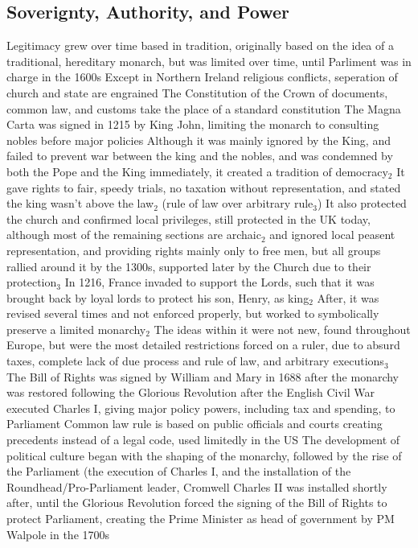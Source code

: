\documentclass[11 pt, twoside]{article}
\newcommand{\foot}[1]{\hyperlink{#1}{$_#1$}}
\newenvironment{outline*}
{
	\begin{outline}[enumerate]
	}
	{\end{outline}
}
\begin{document}
\subsection{Soverignty, Authority, and Power}
\begin{outline*}
\1 Legitimacy grew over time based in tradition, originally based on the idea of a traditional, hereditary monarch, but was limited over time, until Parliment was in charge in the 1600s
\2 Except in Northern Ireland religious conflicts, seperation of church and state are engrained
\2 The Constitution of the Crown of documents, common law, and customs take the place of a standard constitution
\3 The Magna Carta was signed in 1215 by King John, limiting the monarch to consulting nobles before major policies
\4 Although it was mainly ignored by the King, and failed to prevent war between the king and the nobles, and was condemned by both the Pope and the King immediately, it created a tradition of democracy\foot{2}
\4 It gave rights to fair, speedy trials, no taxation without representation, and stated the king wasn't above the law\foot{2} (rule of law over arbitrary rule\foot{3})
\4 It also protected the church and confirmed local privileges, still protected in the UK today, although most of the remaining sections are archaic\foot{2} and ignored local peasent representation, and providing rights mainly only to free men, but all groups rallied around it by the 1300s, supported later by the Church due to their protection\foot{3}
\4 In 1216, France invaded to support the Lords, such that it was brought back by loyal lords to protect his son, Henry, as king\foot{2}
\4 After, it was revised several times and not enforced properly, but worked to symbolically preserve a limited monarchy\foot{2}
\4 The ideas within it were not new, found throughout Europe, but were the most detailed restrictions forced on a ruler, due to absurd taxes, complete lack of due process and rule of law, and arbitrary executions\foot{3}
\3 The Bill of Rights was signed by William and Mary in 1688 after the monarchy was restored following the Glorious Revolution after the English Civil War executed Charles I, giving major policy powers, including tax and spending, to Parliament
\3 Common law rule is based on public officials and courts creating precedents instead of a legal code, used limitedly in the US
\1 The development of political culture began with the shaping of the monarchy, followed by the rise of the Parliament (the execution of Charles I, and the installation of the Roundhead/Pro-Parliament leader, Cromwell
\2 Charles II was installed shortly after, until the Glorious Revolution forced the signing of the Bill of Rights to protect Parliament, creating the Prime Minister as head of government by PM Walpole in the 1700s

\end{outline*}
\end{document}
